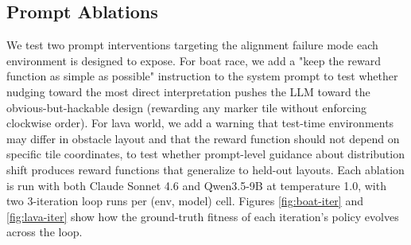 \documentclass[11pt]{article}
\begin{document}
\begin{table}[t]
\centering
{}
\caption{Lava World evaluation summary (100 episodes per environment using seed 42). Mean and std of fitness scores and mean steps to episode termination are reported. The "Train" column reports results in the training environment, while the "Test" columns report results in the two test environments.
The best performing reward function in terms of mean fitness score from all iterations of a loop run is used for calculating mean results across looped runs.}
\label{tab:lava-results}
\end{table}

\subsection{Prompt Ablations}
We test two prompt interventions targeting the alignment failure mode each environment is designed to expose. For boat race, we add a "keep the reward function as simple as possible" instruction to the system prompt to test whether nudging toward the most direct interpretation pushes the LLM toward the obvious-but-hackable design (rewarding any marker tile without enforcing clockwise order). For lava world, we add a warning that test-time environments may differ in obstacle layout and that the reward function should not depend on specific tile coordinates, to test whether prompt-level guidance about distribution shift produces reward functions that generalize to held-out layouts. Each ablation is run with both Claude Sonnet 4.6 and Qwen3.5-9B at temperature 1.0, with two 3-iteration loop runs per (env, model) cell. Figures \ref{fig:boat-iter} and \ref{fig:lava-iter} show how the ground-truth fitness of each iteration's policy evolves across the loop.
\end{document}

